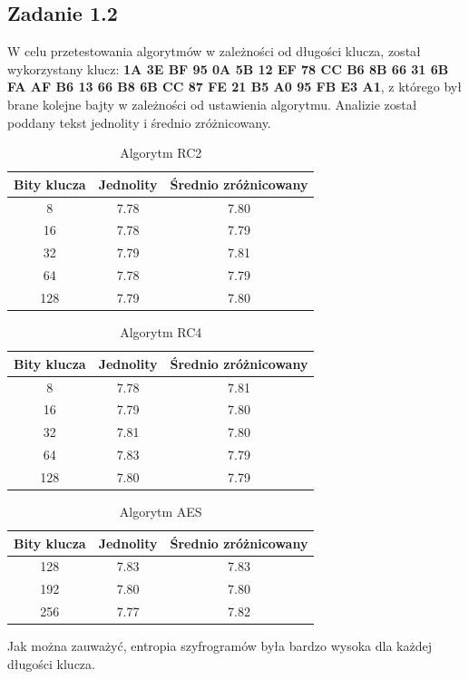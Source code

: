 \documentclass{article}
\begin{document}
\subsection{Zadanie 1.2}
W celu przetestowania algorytmów w zależności od długości klucza, został wykorzystany klucz: \textbf{1A 3E BF 95 0A 5B 12 EF 78 CC B6 8B 66 31 6B FA AF B6 13 66 B8 6B CC 87 FE 21 B5 A0 95 FB E3 A1}, z którego był brane kolejne bajty w zależności od 
ustawienia algorytmu. Analizie został poddany tekst jednolity i średnio zróżnicowany.
    \begin{table}[H]
        \caption{Algorytm RC2}
        \centering
        \begin{tabular}{|c|c|c|}
            \hline
            Bity klucza & Jednolity & Średnio zróżnicowany \\ \hline
            8 & 7.78 & 7.80 \\ \hline
            16 & 7.78 & 7.79 \\ \hline
            32 & 7.79 & 7.81 \\ \hline
            64 & 7.78 & 7.79 \\ \hline
            128 & 7.79 & 7.80 \\ \hline
        \end{tabular}
    \end{table}

    \begin{table}[H]
        \caption{Algorytm RC4}
        \centering
        \begin{tabular}{|c|c|c|}
            \hline
            Bity klucza & Jednolity & Średnio zróżnicowany \\ \hline
            8 & 7.78 & 7.81 \\ \hline
            16 & 7.79 & 7.80 \\ \hline
            32 & 7.81 & 7.80 \\ \hline
            64 & 7.83 & 7.79 \\ \hline
            128 & 7.80 & 7.79 \\ \hline
        \end{tabular}
    \end{table}

    \begin{table}[H]
        \caption{Algorytm AES}
        \centering
        \begin{tabular}{|c|c|c|}
            \hline
            Bity klucza & Jednolity & Średnio zróżnicowany\\ \hline
            128 & 7.83 & 7.83 \\ \hline
            192 & 7.80 & 7.80 \\ \hline
            256 & 7.77 & 7.82 \\ \hline
        \end{tabular}
    \end{table}
    Jak można zauważyć, entropia szyfrogramów była bardzo wysoka dla każdej długości klucza.
\end{document}
